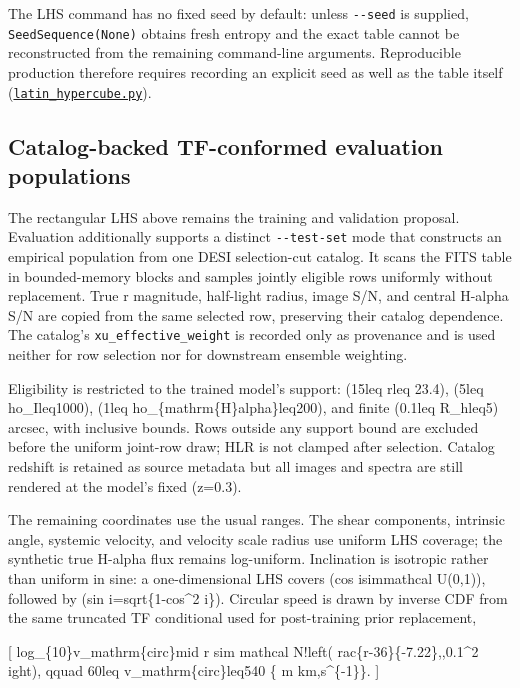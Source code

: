 \documentclass[11pt]{article}
\newcommand{\code}[1]{\nolinkurl{#1}}
\begin{document}
The LHS command has no fixed seed by default: unless \code{--seed} is supplied,
\code{SeedSequence(None)} obtains fresh entropy and the exact table cannot be
reconstructed from the remaining command-line arguments. Reproducible
production therefore requires recording an explicit seed as well as the table
itself (\href{../data_generate/latin_hypercube.py}{\code{latin_hypercube.py}}).

\subsection{Catalog-backed TF-conformed evaluation populations}

The rectangular LHS above remains the training and validation proposal.
Evaluation additionally supports a distinct \code{--test-set} mode that constructs
an empirical population from one DESI selection-cut catalog. It scans the FITS
table in bounded-memory blocks and samples jointly eligible rows uniformly
without replacement. True r magnitude, half-light radius, image S/N, and
central H-alpha S/N are copied from the same selected row, preserving their
catalog dependence. The catalog's \code{xu_effective_weight} is recorded only as
provenance and is used neither for row selection nor for downstream ensemble
weighting.

Eligibility is restricted to the trained model's support: (15leq rleq
23.4), (5leq
ho\_Ileq1000), (1leq
ho\_\{mathrm\{H\}alpha\}leq200),
and finite (0.1leq R\_hleq5) arcsec, with inclusive bounds. Rows outside
any support bound are excluded before the uniform joint-row draw; HLR is not
clamped after selection. Catalog redshift is retained as source metadata but
all images and spectra are still rendered at the model's fixed (z=0.3).

The remaining coordinates use the usual ranges. The shear components,
intrinsic angle, systemic velocity, and velocity scale radius use uniform LHS
coverage; the synthetic true H-alpha flux remains log-uniform. Inclination is
isotropic rather than uniform in sine: a one-dimensional LHS covers
(cos isimmathcal U(0,1)), followed by
(sin i=sqrt\{1-cos\textasciicircum{}2 i\}). Circular speed is drawn by inverse CDF from the
same truncated TF conditional used for post-training prior replacement,

[
log\_\{10\}v\_mathrm\{circ\}mid r
sim mathcal N!left(
rac\{r-36\}\{-7.22\},,0.1\textasciicircum{}2
ight),
qquad 60leq v\_mathrm\{circ\}leq540 \{
m km,s\textasciicircum{}\{-1\}\}.
]
\end{document}
